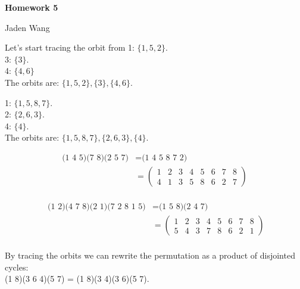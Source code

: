 \documentclass[12pt]{article}
\begin{document}
\centerline {\textsf{\textbf{\LARGE{Homework 5}}}}
\centerline {Jaden Wang}
\vspace{.15in}

\begin{problem}[9.1]
Let's start tracing the orbit from 1: $ \{1,5,2\} $.\\
3: $ \{3\} $.\\
4: $ \{4,6\} $ \\
The orbits are: $ \{1,5,2\}, \{3\},\{4,6\}. $
\end{problem}
\begin{problem}[9.2]
1: $ \{1,5,8,7\} $.\\
2: $ \{2,6,3\} $.\\
4: $ \{4\} $.\\
The orbits are: $ \{1,5,8,7\}, \{2,6,3\},\{4\} $.
\end{problem}

\begin{problem}[9.7]
\begin{align*}
	\text{(1 4 5)(7 8)(2 5 7)}&=\text{(1 4 5 8 7 2)}\\
				  &= \begin{pmatrix} 1&2&3&4&5&6&7&8\\4&1&3&5&8&6&2&7 \end{pmatrix}   \\
\end{align*}
\end{problem}
\begin{problem}[9.8]
\begin{align*}
	\text{ (1 2)(4 7 8)(2 1)(7 2 8 1 5)} &= \text{(1 5 8)(2 4 7)} \\
					     &= \begin{pmatrix} 1&2&3&4&5&6&7&8\\5&4&3&7&8&6&2&1 \end{pmatrix}  \\
\end{align*}
\end{problem}
\begin{problem}[9.10]
By tracing the orbits we can rewrite the permutation as a product of disjointed cycles:\\

(1 8)(3 6 4)(5 7) = (1 8)(3 4)(3 6)(5 7).
\end{problem}
\end{document}
